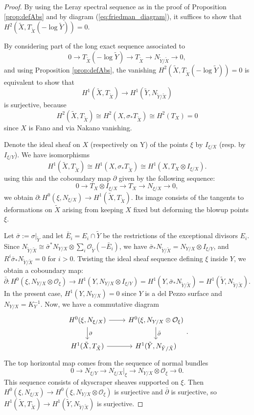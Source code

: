 \documentclass[11pt]{article}
\theoremstyle{definition}
\newcommand{\OO}{\mathcal{O}}
\begin{document}
\begin{proof}
By using the Leray spectral sequence as in the proof of Proposition \ref{prop:defAbs} and by diagram (\ref{eq:friedman_diagram}), it suffices to show that $H^2(\tilde{X}, T_{\tilde X}(-\log \tilde Y))=0.$

By considering part of the long exact sequence associated to
$$0\to T_{\tilde X}(-\log \tilde Y)\to T_{\tilde X}\to N_{\tilde Y/ \tilde X}\to 0,$$
and using Proposition \ref{prop:defAbs}, the vanishing $H^2(\tilde{X}, T_{\tilde X}(-\log \tilde Y))=0$ is equivalent to show that 
$$H^1(\tilde X, T_{\tilde X})\to H^1(\tilde Y, N_{\tilde Y/ \tilde X}) $$
is surjective, because $$H^2(\tilde X, T_{\tilde X})\cong H^2(X, \sigma_* T_{\tilde X})\cong H^2(T_X)=0$$
since $X$ is Fano and via Nakano vanishing. 

Denote the ideal sheaf on $X$ (respectively on Y) of the points $\xi$ by $I_{\xi/X}$ (resp. by $I_{\xi/Y}$).
We have isomorphisms
$$H^1(\tilde X, T_{\tilde X})\cong H^1(X, \sigma_* T_{\tilde X})\cong H^1(X, T_X\otimes I_{\xi/X}). $$
using this and the coboundary map $\partial$ given by the following sequence:
$$0\to T_X\otimes I_{\xi/X}\to T_X\to N_{\xi/X}\to 0, $$
we obtain $\partial: H^0(\xi, N_{\xi/X})\to H^1(\tilde X, T_{\tilde X})$. Its image consists of the tangents to deformations on $\tilde X$ arising from keeping $X$ fixed but deforming the blowup points $\xi$.

Let $\bar{\sigma}:=\sigma\vert_{\tilde Y}$ and let $\bar{E}_i =E_i\cap \tilde{Y}$ be the restrictions of the exceptional divisors $E_i$.
Since $N_{\tilde Y/\tilde X}\cong \bar{\sigma}^* N_{Y/X}\otimes \sum_i \OO_{\tilde Y}(-\bar E_i)$, we have $\bar{\sigma}_* N_{\tilde{Y}/\tilde{X}}=N_{Y/X}\otimes I_{\xi/Y}$, and $R^i \bar{\sigma}_* N_{\tilde Y/\tilde X}=0$ for $i>0$.
Twisting the ideal sheaf sequence defining $\xi$ inside $Y$, we obtain a coboundary map:
$$\bar{\partial}:H^0(\xi, N_{Y/X}\otimes \OO_{\xi})\to H^1(Y, N_{Y/X}\otimes I_{\xi/Y})=H^1(Y, \bar{\sigma}_* N_{\tilde Y/\tilde X})=H^1(\tilde Y, N_{\tilde Y/ \tilde X}). $$
In the present case, $H^1(Y, N_{Y/X})=0$ since $Y$ is a del Pezzo surface and $N_{Y/X}=K_{Y}^{-1}$.
Now, we have a commutative diagram 
$$\begin{tikzcd}
  H^0(\xi,N_{\xi/X}) \ar[r] \ar[d, "\partial"] & H^0(\xi, N_{Y/X}\otimes \OO_\xi) \ar[d, "\bar{\partial} "] \\
  H^1(\tilde X, T_{\tilde X}) \ar[r] & H^1(\tilde Y, N_{\tilde Y/\tilde X})
\end{tikzcd}. $$
The top horizontal map comes from the sequence of normal bundles 
$$0\to N_{\xi/Y}\to N_{\xi/X}\vert_{\xi} \to N_{Y/X}\otimes \OO_{\xi}\to 0.$$ 
This sequence consists of skyscraper sheaves supported on $\xi$. Then $H^0(\xi, N_{\xi/X})\to H^0(\xi, N_{Y/X}\otimes \OO_{\xi})$ is surjective and $\bar{\partial}$ is surjective, so $H^1(\tilde X, T_{\tilde X})\to H^1(\tilde Y, N_{\tilde Y/\tilde X})$ is surjective.
\end{proof}
\end{document}
